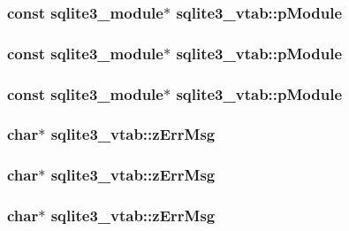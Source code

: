 \subsubsection{\setlength{\rightskip}{0pt plus 5cm}const \bf{sqlite3\_\-module}$\ast$ \bf{sqlite3\_\-vtab::p\-Module}}\label{structsqlite3__vtab_ff18af43c781a9883c34a34265479cd4}


\subsubsection{\setlength{\rightskip}{0pt plus 5cm}const \bf{sqlite3\_\-module}$\ast$ \bf{sqlite3\_\-vtab::p\-Module}}\label{structsqlite3__vtab_ff18af43c781a9883c34a34265479cd4}


\subsubsection{\setlength{\rightskip}{0pt plus 5cm}const \bf{sqlite3\_\-module}$\ast$ \bf{sqlite3\_\-vtab::p\-Module}}\label{structsqlite3__vtab_ff18af43c781a9883c34a34265479cd4}


\subsubsection{\setlength{\rightskip}{0pt plus 5cm}char$\ast$ \bf{sqlite3\_\-vtab::z\-Err\-Msg}}\label{structsqlite3__vtab_da75e92314979a8c9a48c73c95f6c8cc}


\subsubsection{\setlength{\rightskip}{0pt plus 5cm}char$\ast$ \bf{sqlite3\_\-vtab::z\-Err\-Msg}}\label{structsqlite3__vtab_da75e92314979a8c9a48c73c95f6c8cc}


\subsubsection{\setlength{\rightskip}{0pt plus 5cm}char$\ast$ \bf{sqlite3\_\-vtab::z\-Err\-Msg}}\label{structsqlite3__vtab_da75e92314979a8c9a48c73c95f6c8cc}


